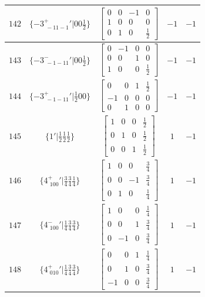 \documentclass[fleqn,8pt]{jsarticle}
\begin{document}
\begin{longtable}{ccccc}
$ 142 $ & $ \{-3^{+}_{\,\,-11-1}{}'|0 0 \frac{1}{2}\} $ & $ \begin{bmatrix} 0 & 0 & -1 & 0 \\ 1 & 0 & 0 & 0 \\ 0 & 1 & 0 & \frac{1}{2} \end{bmatrix} $ & $ -1 $ & $ -1 $ \\ \hline
$ 143 $ & $ \{-3^{-}_{\,\,-1-11}{}'|0 0 \frac{1}{2}\} $ & $ \begin{bmatrix} 0 & -1 & 0 & 0 \\ 0 & 0 & 1 & 0 \\ 1 & 0 & 0 & \frac{1}{2} \end{bmatrix} $ & $ -1 $ & $ -1 $ \\ \hline
$ 144 $ & $ \{-3^{+}_{\,\,-1-11}{}'|\frac{1}{2} 0 0\} $ & $ \begin{bmatrix} 0 & 0 & 1 & \frac{1}{2} \\ -1 & 0 & 0 & 0 \\ 0 & 1 & 0 & 0 \end{bmatrix} $ & $ -1 $ & $ -1 $ \\ \hline
$ 145 $ & $ \{1{}'|\frac{1}{2} \frac{1}{2} \frac{1}{2}\} $ & $ \begin{bmatrix} 1 & 0 & 0 & \frac{1}{2} \\ 0 & 1 & 0 & \frac{1}{2} \\ 0 & 0 & 1 & \frac{1}{2} \end{bmatrix} $ & $ 1 $ & $ -1 $ \\ \hline
$ 146 $ & $ \{4^{+}_{\,\,100}{}'|\frac{3}{4} \frac{3}{4} \frac{1}{4}\} $ & $ \begin{bmatrix} 1 & 0 & 0 & \frac{3}{4} \\ 0 & 0 & -1 & \frac{3}{4} \\ 0 & 1 & 0 & \frac{1}{4} \end{bmatrix} $ & $ 1 $ & $ -1 $ \\ \hline
$ 147 $ & $ \{4^{-}_{\,\,100}{}'|\frac{1}{4} \frac{3}{4} \frac{3}{4}\} $ & $ \begin{bmatrix} 1 & 0 & 0 & \frac{1}{4} \\ 0 & 0 & 1 & \frac{3}{4} \\ 0 & -1 & 0 & \frac{3}{4} \end{bmatrix} $ & $ 1 $ & $ -1 $ \\ \hline
$ 148 $ & $ \{4^{+}_{\,\,010}{}'|\frac{1}{4} \frac{3}{4} \frac{3}{4}\} $ & $ \begin{bmatrix} 0 & 0 & 1 & \frac{1}{4} \\ 0 & 1 & 0 & \frac{3}{4} \\ -1 & 0 & 0 & \frac{3}{4} \end{bmatrix} $ & $ 1 $ & $ -1 $ \\ \hline

\end{longtable}
\end{document}
